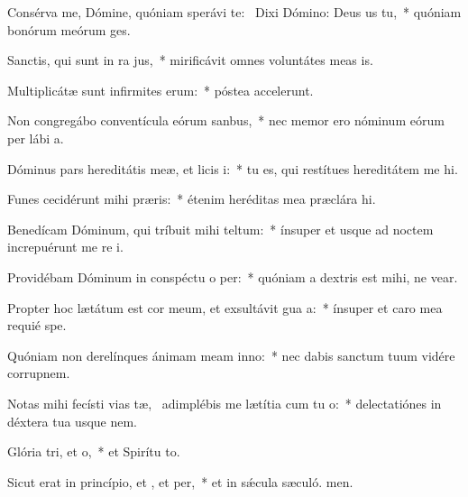 \item Consérva me, Dómine, quóniam sperávi  te:~\pscross{} Dixi Dómino: Deus us  tu,~* quóniam bonórum meórum  ges.
\item Sanctis, qui sunt in ra jus,~* mirificávit omnes voluntátes meas  is.
\item Multiplicátæ sunt infirmites erum:~* póstea accelerunt.
\item Non congregábo conventícula eórum  sanbus,~* nec memor ero nóminum eórum per lábi a.
\item Dóminus pars hereditátis meæ, et licis i:~* tu es, qui restítues hereditátem me hi.
\item Funes cecidérunt mihi  præris:~* étenim heréditas mea præclára  hi.
\item Benedícam Dóminum, qui tríbuit mihi teltum:~* ínsuper et usque ad noctem increpuérunt me re i.
\item Providébam Dóminum in conspéctu o per:~* quóniam a dextris est mihi, ne vear.
\item Propter hoc lætátum est cor meum, et exsultávit gua a:~* ínsuper et caro mea requié  spe.
\item Quóniam non derelínques ánimam meam  inno:~* nec dabis sanctum tuum vidére corrupnem.
\item Notas mihi fecísti vias tæ,~\pscross{} adimplébis me lætítia cum tu o:~* delectatiónes in déxtera tua usque  nem.
\item Glória tri, et o,~* et Spirítu to.
\item Sicut erat in princípio, et , et per,~* et in sǽcula sæculó. men.
